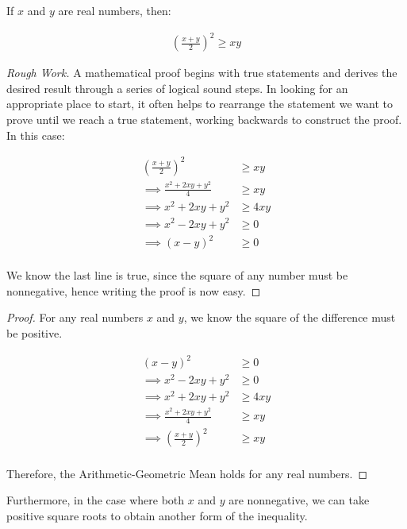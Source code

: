 \begin{theorem} 
	If $x$ and $y$ are real numbers, then:

	\begin{align}
		\left( \frac{x + y}{2} \right)^2 \ge xy
	\end{align}	
\end{theorem}
\begin{proof}[Rough Work]\let\qed\relax
	A mathematical proof begins with true statements and derives the desired result through a series of logical sound steps. In looking for an appropriate place to start, it often helps to rearrange the statement we want to prove until we reach a true statement, working backwards to construct the proof. In this case:
	
	\begin{align*}
		\left( \frac{x + y}{2} \right)^2 &\ge xy \\
		\implies \frac{x^2 + 2xy + y^2}{4} &\ge xy \\
		\implies x^2 + 2xy + y^2 &\ge 4xy \\
		\implies x^2 - 2xy + y^2 &\ge 0 \\
		\implies (x - y)^2 &\ge 0\\
	\end{align*}
	
	We know the last line is true, since the square of any number must be nonnegative, hence writing the proof is now easy.
\end{proof}

\begin{proof}
	For any real numbers $x$ and $y$, we know the square of the difference must be positive.
	
	\begin{align*}
		(x - y)^2 &\ge 0 \\
		\implies x^2 - 2xy + y^2 &\ge 0 \\
		\implies x^2 + 2xy + y^2 &\ge 4xy \\
		\implies \frac{x^2 + 2xy + y^2}{4} &\ge xy \\
		\implies \left( \frac{x + y}{2} \right)^2 &\ge xy \\
	\end{align*}
	
	Therefore, the Arithmetic-Geometric Mean holds for any real numbers.
\end{proof}
\vspace{\baselineskip}

Furthermore, in the case where both $x$ and $y$ are nonnegative, we can take positive square roots to obtain another form of the inequality.

